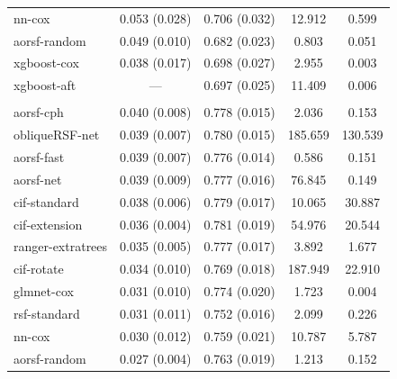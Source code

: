 \documentclass{article}\usepackage[]{graphicx}\usepackage[]{xcolor}
\newenvironment{knitrout}{}{} %
\begin{document}
\begin{knitrout}
\begin{longtable}[t]{lcccc}
\hspace{1em}nn-cox & 0.053 (0.028) & 0.706 (0.032) & 12.912 & 0.599\\
\hspace{1em}aorsf-random & 0.049 (0.010) & 0.682 (0.023) & 0.803 & 0.051\\
\hspace{1em}xgboost-cox & 0.038 (0.017) & 0.698 (0.027) & 2.955 & 0.003\\
\hspace{1em}xgboost-aft & --- & 0.697 (0.025) & 11.409 & 0.006\\
\addlinespace[0.3em]
\multicolumn{5}{l}{\textit{\textbf{JHS; coronary heart disease, n = 3501, p = 80}}}\\
\hline
\hspace{1em}aorsf-cph & 0.040 (0.008) & 0.778 (0.015) & 2.036 & 0.153\\
\hspace{1em}obliqueRSF-net & 0.039 (0.007) & 0.780 (0.015) & 185.659 & 130.539\\
\hspace{1em}aorsf-fast & 0.039 (0.007) & 0.776 (0.014) & 0.586 & 0.151\\
\hspace{1em}aorsf-net & 0.039 (0.009) & 0.777 (0.016) & 76.845 & 0.149\\
\hspace{1em}cif-standard & 0.038 (0.006) & 0.779 (0.017) & 10.065 & 30.887\\
\hspace{1em}cif-extension & 0.036 (0.004) & 0.781 (0.019) & 54.976 & 20.544\\
\hspace{1em}ranger-extratrees & 0.035 (0.005) & 0.777 (0.017) & 3.892 & 1.677\\
\hspace{1em}cif-rotate & 0.034 (0.010) & 0.769 (0.018) & 187.949 & 22.910\\
\hspace{1em}glmnet-cox & 0.031 (0.010) & 0.774 (0.020) & 1.723 & 0.004\\
\hspace{1em}rsf-standard & 0.031 (0.011) & 0.752 (0.016) & 2.099 & 0.226\\
\hspace{1em}nn-cox & 0.030 (0.012) & 0.759 (0.021) & 10.787 & 5.787\\
\hspace{1em}aorsf-random & 0.027 (0.004) & 0.763 (0.019) & 1.213 & 0.152\\

\end{longtable}
\end{knitrout}
\end{document}

